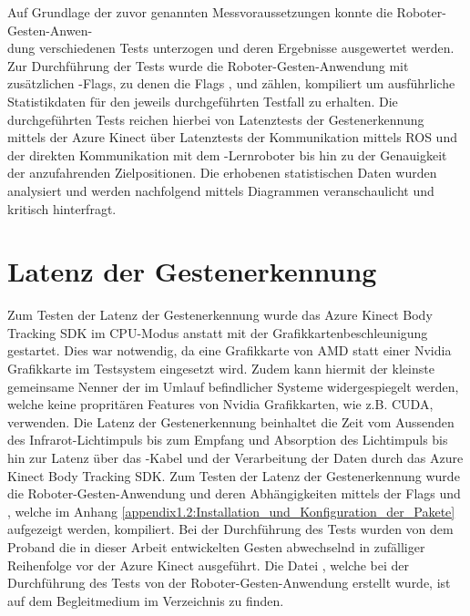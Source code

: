 Auf Grundlage der zuvor genannten Messvoraussetzungen konnte die Roboter-Gesten-Anwen-\\dung verschiedenen Tests unterzogen und deren Ergebnisse ausgewertet werden. Zur Durchführung der Tests wurde die Roboter-Gesten-Anwendung mit zusätzlichen -Flags, zu denen die Flags ,  und  zählen, kompiliert um ausführliche Statistikdaten für den jeweils durchgeführten Testfall zu erhalten. Die durchgeführten Tests reichen hierbei von Latenztests der Gestenerkennung mittels der Azure Kinect über Latenztests der Kommunikation mittels ROS und der direkten Kommunikation mit dem -Lernroboter bis hin zu der Genauigkeit der anzufahrenden Zielpositionen. Die erhobenen statistischen Daten wurden analysiert und werden nachfolgend mittels Diagrammen veranschaulicht und kritisch hinterfragt.

\section{Latenz der Gestenerkennung}
Zum Testen der Latenz der Gestenerkennung wurde das Azure Kinect Body Tracking SDK im CPU-Modus anstatt mit der Grafikkartenbeschleunigung gestartet. Dies war notwendig, da eine Grafikkarte von AMD statt einer Nvidia Grafikkarte im Testsystem eingesetzt wird. Zudem kann hiermit der kleinste gemeinsame Nenner der im Umlauf befindlicher Systeme widergespiegelt werden, welche keine propritären Features von Nvidia Grafikkarten, wie z.B. CUDA, verwenden. Die Latenz der Gestenerkennung beinhaltet die Zeit vom Aussenden des Infrarot-Lichtimpuls bis zum Empfang und Absorption des Lichtimpuls bis hin zur Latenz über das -Kabel und der Verarbeitung der Daten durch das Azure Kinect Body Tracking SDK. Zum Testen der Latenz der Gestenerkennung wurde die Roboter-Gesten-Anwendung und deren Abhängigkeiten mittels der Flags  und , welche im Anhang \ref{appendix1.2:Installation_und_Konfiguration_der_Pakete} aufgezeigt werden, kompiliert. Bei der Durchführung des Tests wurden von dem Proband die in dieser Arbeit entwickelten Gesten abwechselnd in zufälliger Reihenfolge vor der Azure Kinect ausgeführt. Die Datei , welche bei der Durchführung des Tests von der Roboter-Gesten-Anwendung erstellt wurde, ist auf dem Begleitmedium im Verzeichnis  zu finden.

